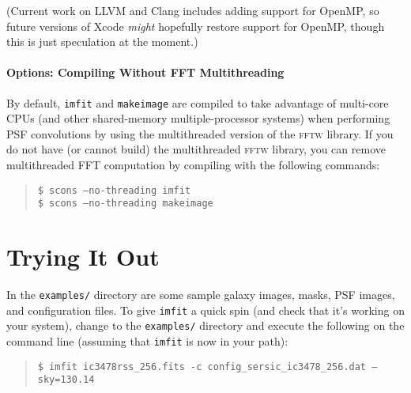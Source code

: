 \documentclass[10pt,a4paper,article]{memoir}
\newcommand{\imfit}{\texttt{imfit}}
\newcommand{\makeimage}{\texttt{makeimage}}
\begin{document}
(Current work on LLVM and Clang includes adding support for OpenMP, so future versions
of Xcode \textit{might} hopefully restore support for OpenMP, though this is just
speculation at the moment.)



\subsubsection{Options: Compiling Without FFT Multithreading}

By default, \imfit{} and \makeimage{} are compiled to take advantage of multi-core CPUs (and other
shared-memory multiple-processor systems) when performing PSF convolutions by using the 
multithreaded version of the
\textsc{fftw} library. If you do not have (or cannot build) the multithreaded \textsc{fftw} library,
you can remove multithreaded FFT computation by compiling with the following commands:
\begin{quote}
\texttt{\$ scons --no-threading imfit} \\
\texttt{\$ scons --no-threading makeimage}
\end{quote}






\chapter{Trying It Out}

In the \texttt{examples/} directory are some sample galaxy images, masks, PSF images, and
configuration files. To give \imfit{} a quick spin (and check that it's working on your system), change to the
\texttt{examples/} directory and execute the following on the command line (assuming that
\imfit{} is now in your path):
\begin{quote}
\texttt{\$ imfit ic3478rss\_256.fits \texttt{-c} config\_sersic\_ic3478\_256.dat \texttt{--}sky=130.14}
\end{quote}
\end{document}
